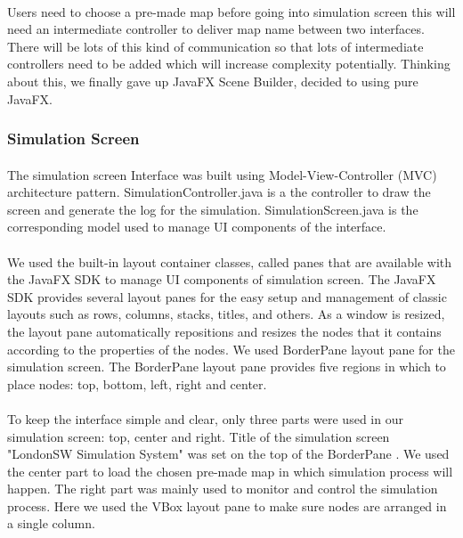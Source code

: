 \documentclass[a4paper,11pt,titlepage]{article}
\begin{document}
\paragraph{}
Users need to choose a pre-made map before going into simulation screen this will need an intermediate controller to deliver map name between two interfaces. There will be lots of this kind of communication so that lots of intermediate controllers need to be added which will increase complexity potentially. Thinking about this, we finally gave up JavaFX Scene Builder, decided to using pure JavaFX.

\subsubsection{Simulation Screen}
\paragraph{}
The simulation screen Interface was built using Model-View-Controller (MVC) architecture pattern. SimulationController.java is a the controller to draw the screen and generate the log for the simulation. SimulationScreen.java is the corresponding model used to manage UI components of the interface. 
\paragraph{}
We used the built-in layout container classes, called panes that are available with the JavaFX SDK to manage UI components of simulation screen. The JavaFX SDK provides several layout panes for the easy setup and management of classic layouts such as rows, columns, stacks, titles, and others. As a window is resized, the layout pane automatically repositions and resizes the nodes that it contains according to the properties of the nodes. We used BorderPane layout pane for the simulation screen. The BorderPane layout pane provides five regions in which to place nodes: top, bottom, left, right and center. 
\paragraph{}
To keep the interface simple and clear, only three parts were used in our simulation screen: top, center and right. Title of the simulation screen "LondonSW Simulation System" was set on the top of the BorderPane . We used the center part to load the chosen pre-made map in which simulation process will happen. The right part was mainly used to monitor and control the simulation process. Here we used the VBox layout pane to make sure nodes are arranged in a single column. 
\end{document}
